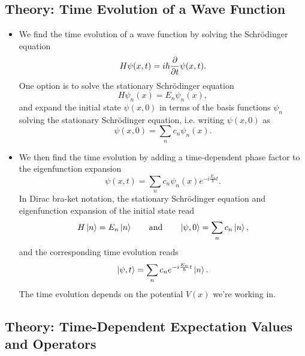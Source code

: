 \documentclass[11pt, a4paper]{article}
\newcommand{\eqtext}[1]{\qquad \text{#1} \qquad}
\newcommand{\Schro}{Schr\"{o}dinger\xspace}
\begin{document}
\subsection{Theory: Time Evolution of a Wave Function}
\begin{itemize}
	\item We find the time evolution of a wave function by solving the \Schro equation
	\begin{equation*}
		H\psi(x, t) = i\hbar \pdv{t}\psi(x, t).
	\end{equation*}
	One option is to solve the stationary \Schro equation
	\begin{equation*}
		H \psi_{n}(x) = E_{n}\psi_{n}(x),
	\end{equation*}
	and expand the initial state $ \psi(x, 0) $ in terms of the basis functions $ \psi_{n} $ solving the stationary \Schro equation, i.e. writing $ \psi(x, 0) $ as
	\begin{equation*}
		\psi(x, 0) = \sum_{n}c_{n}\psi_{n}(x).
	\end{equation*}
	\item We then find the time evolution by adding a time-dependent phase factor to the eigenfunction expansion
	\begin{equation*}
		\psi(x, t) = \sum_{n}c_{n}\psi_{n}(x)e^{-i\frac{E_{n}}{\hbar}t}.
	\end{equation*}
	In Dirac bra-ket notation, the stationary \Schro equation and eigenfunction expansion of the initial state read
	\begin{equation*}
		H\ket{n} = E_{n}\ket{n} \eqtext{and} \ket{\psi, 0} = \sum_{n}c_{n}\ket{n},
	\end{equation*}
	and the corresponding time evolution reads
	\begin{equation*}
		\ket{\psi, t} = \sum_{n}c_{n} e^{-i\frac{E_{n}}{\hbar}t} \ket{n}.
	\end{equation*}
	The time evolution depends on the potential $ V(x) $ we're working in.
\end{itemize}

\subsection{Theory: Time-Dependent Expectation Values and Operators}
\end{document}

